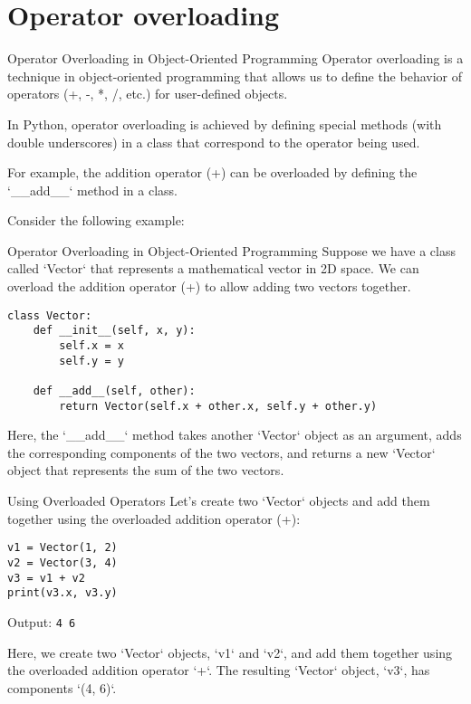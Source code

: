 \documentclass[handout]{beamer}
\begin{document}
\section{Operator overloading}

\begin{frame}[fragile]{Operator Overloading in Object-Oriented Programming}
Operator overloading is a technique in object-oriented programming that allows us to define the behavior of operators (+, -, *, /, etc.) for user-defined objects.

In Python, operator overloading is achieved by defining special methods (with double underscores) in a class that correspond to the operator being used.

For example, the addition operator (+) can be overloaded by defining the `\_\_add\_\_` method in a class. 

Consider the following example:
\end{frame}


\begin{frame}[fragile]{Operator Overloading in Object-Oriented Programming}
Suppose we have a class called `Vector` that represents a mathematical vector in 2D space. We can overload the addition operator (+) to allow adding two vectors together.

\begin{lstlisting}[style=python]
class Vector:
    def __init__(self, x, y):
        self.x = x
        self.y = y

    def __add__(self, other):
        return Vector(self.x + other.x, self.y + other.y)
\end{lstlisting}

Here, the `\_\_add\_\_` method takes another `Vector` object as an argument, adds the corresponding components of the two vectors, and returns a new `Vector` object that represents the sum of the two vectors.
\end{frame}

\begin{frame}[fragile]{Using Overloaded Operators}
Let's create two `Vector` objects and add them together using the overloaded addition operator (+):

\begin{lstlisting}[style=python]
v1 = Vector(1, 2)
v2 = Vector(3, 4)
v3 = v1 + v2
print(v3.x, v3.y)
\end{lstlisting}

Output: \texttt{4 6}

Here, we create two `Vector` objects, `v1` and `v2`, and add them together using the overloaded addition operator `+`. The resulting `Vector` object, `v3`, has components `(4, 6)`.

\end{frame}
\end{document}
